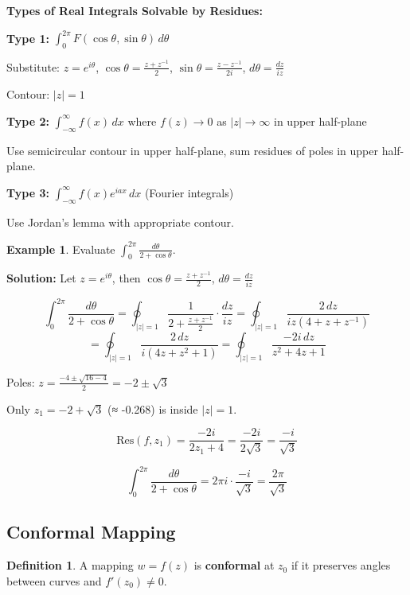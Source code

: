\documentclass[12pt,a4paper]{article}
\theoremstyle{definition}
\newtheorem{definition}[theorem]{Definition}
\newtheorem{example}[theorem]{Example}
\begin{document}
\begin{tipbox}
\textbf{Types of Real Integrals Solvable by Residues:}

\textbf{Type 1:} $\int_0^{2\pi} F(\cos\theta, \sin\theta)\,d\theta$

Substitute: $z = e^{i\theta}$, $\cos\theta = \frac{z + z^{-1}}{2}$, $\sin\theta = \frac{z - z^{-1}}{2i}$, $d\theta = \frac{dz}{iz}$

Contour: $|z| = 1$

\textbf{Type 2:} $\int_{-\infty}^{\infty} f(x)\,dx$ where $f(z) \to 0$ as $|z| \to \infty$ in upper half-plane

Use semicircular contour in upper half-plane, sum residues of poles in upper half-plane.

\textbf{Type 3:} $\int_{-\infty}^{\infty} f(x)e^{iax}\,dx$ (Fourier integrals)

Use Jordan's lemma with appropriate contour.
\end{tipbox}

\begin{example}
Evaluate $\int_0^{2\pi} \frac{d\theta}{2 + \cos\theta}$.

\textbf{Solution:}
Let $z = e^{i\theta}$, then $\cos\theta = \frac{z + z^{-1}}{2}$, $d\theta = \frac{dz}{iz}$

\[
\int_0^{2\pi} \frac{d\theta}{2 + \cos\theta} = \oint_{|z|=1} \frac{1}{2 + \frac{z + z^{-1}}{2}} \cdot \frac{dz}{iz} = \oint_{|z|=1} \frac{2\,dz}{iz(4 + z + z^{-1})}
\]
\[
= \oint_{|z|=1} \frac{2\,dz}{i(4z + z^2 + 1)} = \oint_{|z|=1} \frac{-2i\,dz}{z^2 + 4z + 1}
\]

Poles: $z = \frac{-4 \pm \sqrt{16 - 4}}{2} = -2 \pm \sqrt{3}$

Only $z_1 = -2 + \sqrt{3}$ (≈ -0.268) is inside $|z| = 1$.

\[
\text{Res}(f, z_1) = \frac{-2i}{2z_1 + 4} = \frac{-2i}{2\sqrt{3}} = \frac{-i}{\sqrt{3}}
\]

\[
\int_0^{2\pi} \frac{d\theta}{2 + \cos\theta} = 2\pi i \cdot \frac{-i}{\sqrt{3}} = \frac{2\pi}{\sqrt{3}}
\]
\end{example}

\subsection{Conformal Mapping}

\begin{definition}
A mapping $w = f(z)$ is \textbf{conformal} at $z_0$ if it preserves angles between curves and $f'(z_0) \neq 0$.
\end{definition}
\end{document}
